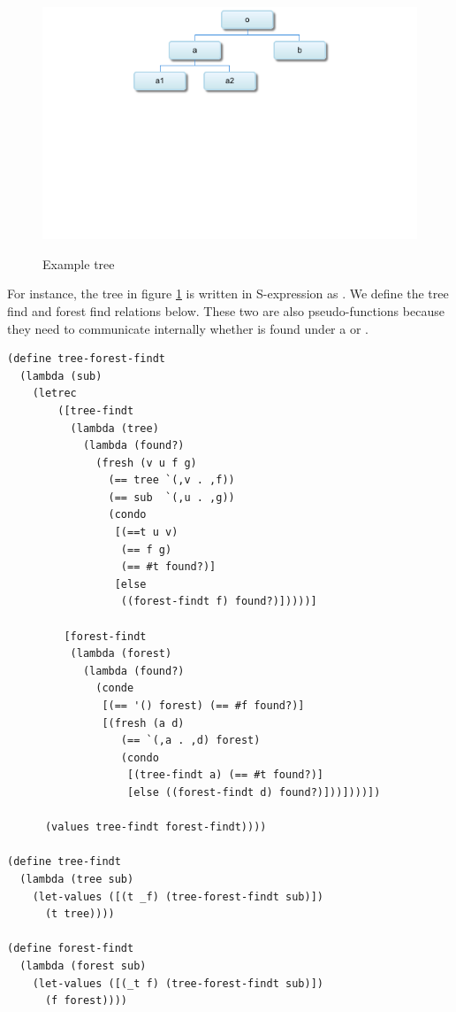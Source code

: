 \begin{figure}
    {\includegraphics[width=\textwidth]
    {figures/example-tree.png}}
    \caption{\label{example-tree} Example tree}
\end{figure}

For instance, the tree in figure \ref{example-tree} is written in S-expression as . We define the tree find and forest find relations below. These two are also pseudo-functions because they need to communicate internally whether  is found under a  or .
\begin{lstlisting}
(define tree-forest-findt
  (lambda (sub)
    (letrec
        ([tree-findt
          (lambda (tree)
            (lambda (found?)
              (fresh (v u f g)
                (== tree `(,v . ,f))
                (== sub  `(,u . ,g))
                (condo
                 [(==t u v)
                  (== f g)
                  (== #t found?)]
                 [else
                  ((forest-findt f) found?)]))))]

         [forest-findt
          (lambda (forest)
            (lambda (found?)
              (conde
               [(== '() forest) (== #f found?)]
               [(fresh (a d)
                  (== `(,a . ,d) forest)
                  (condo
                   [(tree-findt a) (== #t found?)]
                   [else ((forest-findt d) found?)]))])))])

      (values tree-findt forest-findt))))

(define tree-findt
  (lambda (tree sub)
    (let-values ([(t _f) (tree-forest-findt sub)])
      (t tree))))

(define forest-findt
  (lambda (forest sub)
    (let-values ([(_t f) (tree-forest-findt sub)])
      (f forest))))
\end{lstlisting}

